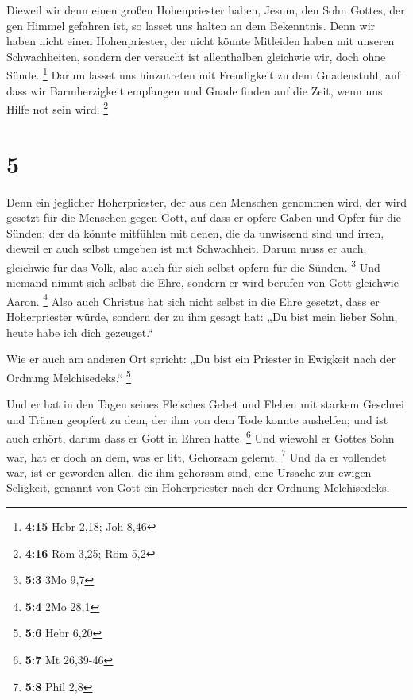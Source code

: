  Dieweil wir denn einen großen Hohenpriester haben,
Jesum, den Sohn Gottes, der gen Himmel gefahren ist, so lasset uns
halten an dem Bekenntnis.  Denn wir haben nicht einen
Hohenpriester, der nicht könnte Mitleiden haben mit unseren
Schwachheiten, sondern der versucht ist allenthalben gleichwie wir, doch
ohne Sünde. \footnote{\textbf{4:15} Hebr 2,18; Joh 8,46} 
Darum lasset uns hinzutreten mit Freudigkeit zu dem Gnadenstuhl, auf
dass wir Barmherzigkeit empfangen und Gnade finden auf die Zeit, wenn
uns Hilfe not sein wird. \footnote{\textbf{4:16} Röm 3,25; Röm 5,2}

\hypertarget{section-2}{%
\section{5}\label{section-2}}

 Denn ein jeglicher Hoherpriester, der aus den Menschen
genommen wird, der wird gesetzt für die Menschen gegen Gott, auf dass er
opfere Gaben und Opfer für die Sünden;  der da könnte
mitfühlen mit denen, die da unwissend sind und irren, dieweil er auch
selbst umgeben ist mit Schwachheit.  Darum muss er auch,
gleichwie für das Volk, also auch für sich selbst opfern für die Sünden.
\footnote{\textbf{5:3} 3Mo 9,7}  Und niemand nimmt sich
selbst die Ehre, sondern er wird berufen von Gott gleichwie Aaron.
\footnote{\textbf{5:4} 2Mo 28,1}  Also auch Christus hat
sich nicht selbst in die Ehre gesetzt, dass er Hoherpriester würde,
sondern der zu ihm gesagt hat: „Du bist mein lieber Sohn, heute habe ich
dich gezeuget.``

 Wie er auch am anderen Ort spricht: „Du bist ein Priester
in Ewigkeit nach der Ordnung Melchisedeks.`` \footnote{\textbf{5:6} Hebr
  6,20}

 Und er hat in den Tagen seines Fleisches Gebet und Flehen
mit starkem Geschrei und Tränen geopfert zu dem, der ihm von dem Tode
konnte aushelfen; und ist auch erhört, darum dass er Gott in Ehren
hatte. \footnote{\textbf{5:7} Mt 26,39-46}  Und wiewohl er
Gottes Sohn war, hat er doch an dem, was er litt, Gehorsam gelernt.
\footnote{\textbf{5:8} Phil 2,8}  Und da er vollendet war,
ist er geworden allen, die ihm gehorsam sind, eine Ursache zur ewigen
Seligkeit,  genannt von Gott ein Hoherpriester nach der
Ordnung Melchisedeks.

